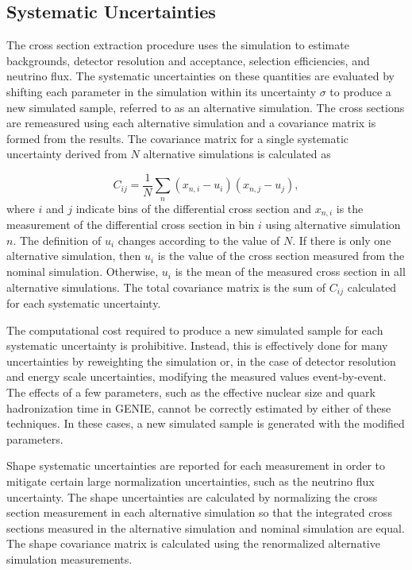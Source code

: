 \subsection{Systematic Uncertainties}
The cross section extraction procedure uses the simulation to estimate backgrounds, detector resolution and acceptance, 
selection efficiencies, and neutrino flux.  The systematic uncertainties on these quantities are evaluated by shifting each parameter in the simulation 
within its uncertainty $\sigma$ to produce a new simulated sample, referred to as an alternative simulation.  The cross sections are remeasured 
using each alternative simulation and a 
covariance matrix is formed from the results.  The covariance matrix for a single systematic uncertainty derived from $N$
alternative simulations is calculated as

\begin{equation}\label{eq:covmx}
C_{ij} = \frac{1}{N}\sum_{n}\left(x_{n,i} - u_{i}\right)\left(x_{n,j}-u_{j}\right),
\end{equation} 
where $i$ and $j$ indicate bins of the differential cross section and $x_{n,i}$ is the measurement of the differential cross section in bin $i$ using 
alternative simulation $n$.  The definition of $u_{i}$ changes according to the value of $N$.  If there is only one
alternative simulation, then $u_{i}$ is 
the value of the cross section measured from the nominal simulation.  Otherwise, $u_{i}$ is the mean of the measured 
cross section in all alternative simulations.  The total covariance matrix is the sum of $C_{ij}$ calculated for each systematic uncertainty.

The computational cost required to produce a new simulated sample for each systematic uncertainty is prohibitive.  Instead, this is 
effectively done for many uncertainties by reweighting the simulation or, in the case of detector resolution and energy scale uncertainties,
modifying the measured values 
event-by-event.  The effects of a few parameters, such as the effective nuclear size and quark hadronization time in GENIE, cannot be correctly estimated 
by either of these techniques.  In these cases, a new simulated sample is generated with the modified parameters.

Shape systematic uncertainties are reported for each measurement in order to mitigate certain large normalization uncertainties, such as the neutrino 
flux uncertainty.  The shape uncertainties are calculated by normalizing the cross section measurement in 
each alternative simulation so that the integrated cross sections measured in the alternative simulation and nominal simulation are equal.  The shape covariance 
matrix is calculated using the renormalized alternative simulation measurements.

